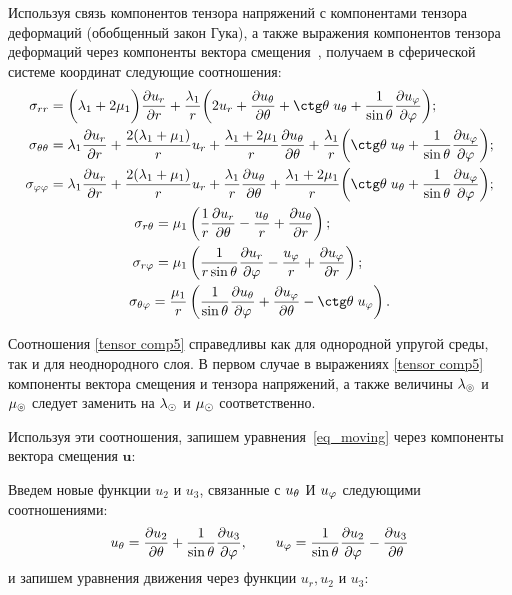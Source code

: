 Используя связь компонентов тензора напряжений с компонентами тензора деформаций (обобщенный закон Гука), а также выражения компонентов тензора деформаций через компоненты вектора смещения~\cite{Nowacki}, получаем в сферической системе координат следующие соотношения:
\begin{equation}\label{tensor comp}
    \begin{gathered}
    \begin{aligned}
        \si_{rr} &= \biggl(\la_1+2\mu_1\biggr)\fr{\de u_r}{\de r} + \fr{\la_1} r \biggl(2u_r+\fr{\de u_\Q}{\de\Q}+\ctg\Q\;u_\Q + \fr{1}{\sin\Q}\fr{\de u_\f}{\de\f}\biggr);\\
        \si_{\Q\Q} &= \la_1\fr{\de u_r}{\de r} + \fr{2(\la_1+\mu_1)}r u_r + \fr{\la_1+2\mu_1}r \fr{\de u_\Q}{\de\Q} + \fr{\la_1} r \biggl(\ctg\Q \;u_\Q + \fr{1}{\sin\Q}\fr{\de u_\f}{\de\f}\biggr);\\
        \si_{\f\f} &= \la_1\fr{\de u_r}{\de r} + \fr{2(\la_1+\mu_1)}r u_r + \fr{\la_1} r \fr{\de u_\Q}{\de\Q} + \fr{\la_1+2\mu_1}r\biggl(\ctg\Q \;u_\Q + \fr{1}{\sin\Q}\fr{\de u_\f}{\de\f}\biggr);\\
    \end{aligned}\\
    \begin{aligned}
        \si_{r\Q}=\mu_1&\left(\fr1r \fr{\de u_r}{\de\Q} - \fr{u_\Q}{r} + \fr{\de u_\Q}{\de r}\right);\\
        \si_{r\f}=\mu_1&\left(\fr1{r\sin\Q} \fr{\de u_r}{\de\f} - \fr{u_\f}{r} + \fr{\de u_\f}{\de r}\right);\\
        \si_{\Q\f}=\fr{\mu_1} r&\left(\fr1{\sin\Q} \fr{\de u_\Q}{\de\f} + \fr{\de u_\f}{\de\Q} - \ctg\Q \;u_\f \right).\\
    \end{aligned}
    \end{gathered}
\end{equation}

Соотношения \eqref{tensor comp5} справедливы как для однородной упругой среды, так и для неоднородного слоя. В первом случае в выражениях \eqref{tensor comp5} компоненты вектора смещения и тензора напряжений, а также величины $\lambda_\circledcirc$ и $\mu_\circledcirc$ следует заменить на $\lambda_\odot$ и $\mu_\odot$ соответственно.

Используя эти соотношения, запишем уравнения~\eqref{eq_moving} через компоненты вектора смещения $\mathbf{u}$:

Введем новые функции $u_2$ и $u_3$, связанные с $u_\theta$ И $u_\varphi$ следующими соотношениями:
$$
u_\theta = \dfrac{\partial u_2}{\partial\theta} + \frac1{\sin\theta}\frac{\partial u_3}{\partial\varphi}, \qquad u_\varphi = \dfrac1{\sin\theta}\dfrac{\partial u_2}{\partial\varphi} - \dfrac{\partial u_3}{\partial\theta}
$$
и запишем уравнения движения через функции $u_r, u_2$ и $u_3:$

